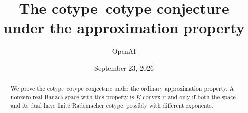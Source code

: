 \documentclass[11pt]{article}
\title{The cotype--cotype conjecture\\under the approximation property}
\author{OpenAI}
\date{September 23, 2026}
\theoremstyle{definition}
\theoremstyle{remark}
\numberwithin{equation}{section}
\begin{document}
\maketitle
\begin{abstract}
We prove the cotype--cotype conjecture under the ordinary approximation
property. A nonzero real Banach space with this property is \(K\)-convex
if and only if both the space and its dual have finite Rademacher cotype,
possibly with different exponents.
\end{abstract}








\end{document}
